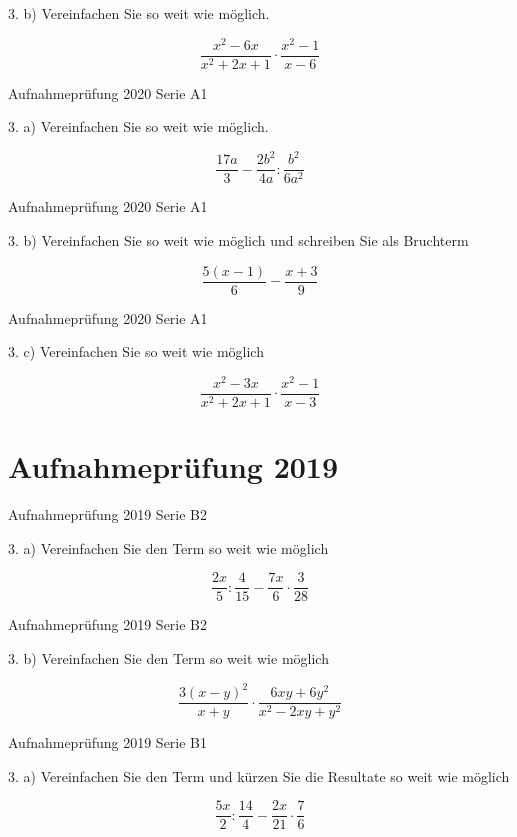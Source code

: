 {3. b) Vereinfachen Sie so weit wie möglich.

$$\frac{x^2-6x}{x^2+2x+1} \cdot{} \frac{x^2-1}{x-6}$$

Aufnahmeprüfung 2020 Serie A1

3. a) Vereinfachen Sie so weit wie möglich.

$$\frac{17a}{3} - \frac{2b^2}{4a}  :   \frac{b^2}{6a^2}$$

Aufnahmeprüfung 2020 Serie A1

3. b) Vereinfachen Sie so weit wie möglich und schreiben Sie als Bruchterm

$$\frac{5(x-1)}{6} - \frac{x+3}{9}$$

Aufnahmeprüfung 2020 Serie A1

3. c) Vereinfachen Sie so weit wie möglich

$$\frac{x^2-3x}{x^2+2x+1} \cdot{} \frac{x^2-1}{x-3}$$

\section*{Aufnahmeprüfung 2019}
Aufnahmeprüfung 2019 Serie B2

3. a) Vereinfachen Sie den Term so weit wie möglich

$$\frac{2x}{5} : \frac{4}{15} - \frac{7x}{6} \cdot{} \frac{3}{28}$$

Aufnahmeprüfung 2019 Serie B2

3. b) Vereinfachen Sie den Term so weit wie möglich

$$\frac{3(x-y)^2}{x+y} \cdot{} \frac{6xy+6y^2}{x^2-2xy+y^2}$$

Aufnahmeprüfung 2019 Serie B1

3. a) Vereinfachen Sie den Term und kürzen Sie die Resultate so weit wie möglich

$$\frac{5x}{2} : \frac{14}{4} - \frac{2x}{21} \cdot{} \frac{7}{6}$$

}
